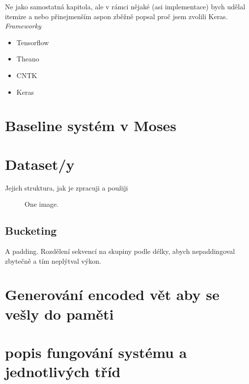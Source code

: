 Ne jako samostatná kapitola, ale v rámci nějaké (asi implementace) bych udělal itemize a nebo přinejmenším aspon zběžně popsal proč jsem zvolili Keras.
\emph{Frameworky}
\begin{itemize}
  \item Tensorflow
  \item Theano
  \item CNTK
  \item Keras
\end{itemize}

\section{Baseline systém v Moses}

\section{Dataset/y}
Jejich struktura, jak je zpracuji a použiji

\begin{figure}
    \begin{center}
    \end{center}
	\caption{One image. }
	\label{img:TODO}
\end{figure}


\subsection{Bucketing}
A padding. Rozdělení sekvencí na skupiny podle délky, abych nepaddingoval zbytečně a tím neplýtval výkon. 

\section{Generování encoded vět aby se vešly do paměti}

\section{popis fungování systému a jednotlivých tříd}

